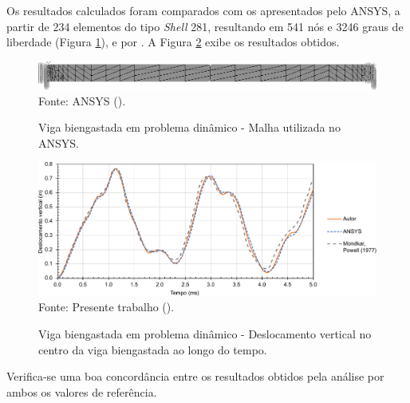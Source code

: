 Os resultados calculados foram comparados com os apresentados pelo ANSYS, a partir de 234 elementos do tipo \textit{Shell} 281, resultando em 541 nós e 3246 graus de liberdade (Figura \ref{fig:beamANSYS2}), e por \cite{mondkar1977ansa}. A Figura \ref{fig:res-viga2} exibe os resultados obtidos.

\begin{figure}[h!]
    \centering
    \caption{Viga biengastada em problema dinâmico - Malha utilizada no ANSYS.}
    \includegraphics[width=\linewidth]{Figuras/vigas/ANSYSmesh2.png}
    \\Fonte: ANSYS (\the\year).
    \label{fig:beamANSYS2}
\end{figure}

\begin{figure}[h!]
    \centering
    \caption{Viga biengastada em problema dinâmico - Deslocamento vertical no centro da viga biengastada ao longo do tempo.}
    \includegraphics[width=\linewidth]{Figuras/vigas/res2.pdf}
    \\Fonte: Presente trabalho (\the\year).
    \label{fig:res-viga2}
\end{figure}

Verifica-se uma boa concordância entre os resultados obtidos pela análise por ambos os valores de referência.